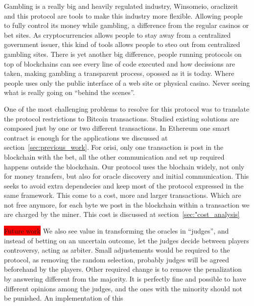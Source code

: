 Gambling is a really big and heavily regulated industry, Winsomeio, oraclizeit
  and this protocol are tools  to make this industry more flexible.
Allowing people to fully control its money while gambling, a difference from
  the regular casinos or bet sites.
As cryptocurrencies allows people to stay away from a centralized government
  issuer, this kind of tools allows people to steo out from centralized gambling
  sites.
There is yet another big difference, people running protocols on top of
  blockchains can see every line of code executed and how decissions are taken,
  making gambling a transparent process, opossed as it is today.
Where people uses only the public interface of a web site or physical casino.
Never seeing what is really going on ``behind the scenes''.

One of the most challenging problems to resolve for this protocol was to
  translate the protocol restrictions to Bitcoin transactions.
Studied existing solutions are composed just by one or two different
  transactions.
In Ethereum one smart contract is enough for the applications we discussed at
  section~\ref{sec:previous_work}.
For orisi, only one transaction is post in the blockchain with the bet, all
  the other communication and set up required happens outside the blockchain.
Our protocol uses the blochain widely, not only for money transfers, but also
  for oracle discovery and initial communication.
This seeks to avoid extra dependecies and keep most of the protocol expressed
  in the same framework.
This come to a cost, more and larger transactions.
Which are not free anymore, for each byte we post in the blockchain within
  a transaction we are charged by the miner.
This cost is discussed at section~\ref{sec:"cost_analysis}

\colorbox{red}{Future work}
We also see value in transforming the oracles in ``judges'', and instead of
  betting on an uncertain outcome, let the judges decide between players
  controversy, acting as arbiter.
Small adjustements would be required to the protocol, as removing the random
  selection, probably judges will be agreed beforehand by the players.
Other required change is to remove the penalization by answering different
  from the majority.
It is perfectly fine and possible to have different opinions among the
  judges, and the ones with the minority should not be punished.
An implementation of this

